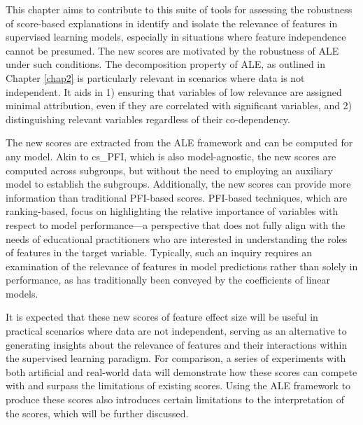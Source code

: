 This chapter aims to contribute to this suite of tools for assessing the robustness of score-based explanations in identify and isolate the relevance of features in supervised learning models, especially in situations where feature independence cannot be presumed. The new scores are motivated by the robustness of ALE under such conditions. The decomposition property of ALE, as outlined in Chapter \ref{chap2} is particularly relevant in scenarios where data is not independent. It aids in 1) ensuring that variables of low relevance are assigned minimal attribution, even if they are correlated with significant variables, and 2) distinguishing relevant variables regardless of their co-dependency.

The new scores are extracted from the ALE framework and can be computed for any model. Akin to cs\_PFI, which is also model-agnostic, the new scores are computed across subgroups, but without the need to employing an auxiliary model to establish the subgroups. Additionally, the new scores can provide more information than traditional PFI-based scores. PFI-based techniques, which are ranking-based, focus on highlighting the relative importance of variables with respect to model performance—a perspective that does not fully align with the needs of educational practitioners who are interested in understanding the roles of features in the target variable. Typically, such an inquiry requires an examination of the relevance of features in model predictions rather than solely in performance, as has traditionally been conveyed by the coefficients of linear models.

It is expected that these new scores of feature effect size will be useful in practical scenarios where data are not independent, serving as an alternative to generating insights about the relevance of features and their interactions within the supervised learning paradigm. For comparison, a series of experiments with both artificial and real-world data will demonstrate how these scores can compete with and surpass the limitations of existing scores. Using the ALE framework to produce these scores also introduces certain limitations to the interpretation of the scores, which will be further discussed.  